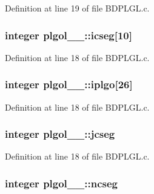 Definition at line 19 of file B\+D\+P\+L\+G\+L.\+c.

\subsubsection[{\texorpdfstring{icseg}{icseg}}]{\setlength{\rightskip}{0pt plus 5cm}integer plgol\+\_\+\_\+\+::icseg\mbox{[}10\mbox{]}}\hypertarget{structplgol__1___a84f8c270e0daa259175f2a20c4a2c7d7}{}\label{structplgol__1___a84f8c270e0daa259175f2a20c4a2c7d7}


Definition at line 18 of file B\+D\+P\+L\+G\+L.\+c.

\subsubsection[{\texorpdfstring{iplgo}{iplgo}}]{\setlength{\rightskip}{0pt plus 5cm}integer plgol\+\_\+\_\+\+::iplgo\mbox{[}26\mbox{]}}\hypertarget{structplgol__1___a32a2e59eb008ef43088590b0d5d9bad7}{}\label{structplgol__1___a32a2e59eb008ef43088590b0d5d9bad7}


Definition at line 18 of file B\+D\+P\+L\+G\+L.\+c.

\subsubsection[{\texorpdfstring{jcseg}{jcseg}}]{\setlength{\rightskip}{0pt plus 5cm}integer plgol\+\_\+\_\+\+::jcseg}\hypertarget{structplgol__1___aa429c3e8a2db853c48bb7460e34ea585}{}\label{structplgol__1___aa429c3e8a2db853c48bb7460e34ea585}


Definition at line 18 of file B\+D\+P\+L\+G\+L.\+c.

\subsubsection[{\texorpdfstring{ncseg}{ncseg}}]{\setlength{\rightskip}{0pt plus 5cm}integer plgol\+\_\+\_\+\+::ncseg}\hypertarget{structplgol__1___af13a26e581bc7e4c2933b38cf4f3ad45}{}\label{structplgol__1___af13a26e581bc7e4c2933b38cf4f3ad45}


